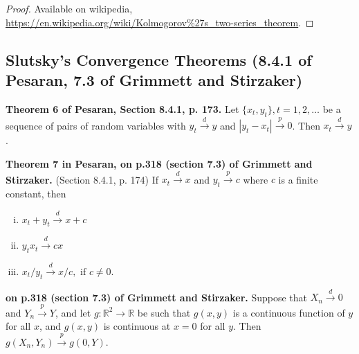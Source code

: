 \begin{proof}Available on wikipedia, \url{https://en.wikipedia.org/wiki/Kolmogorov\%27s_two-series_theorem}.\end{proof}

\subsection{Slutsky's Convergence Theorems (8.4.1 of Pesaran, 7.3 of Grimmett and Stirzaker)}

\begin{theorem}\textbf{Theorem 6 of Pesaran, Section 8.4.1, p. 173.} Let \( \{x_t, y_t\}, t = 1, 2, \ldots\) be a sequence of pairs of random variables with \(y_t \xrightarrow{d} y\) and \(\left| y_t - x_t \right| \xrightarrow{p}  0\). Then \(x_t \xrightarrow{d} y\). \end{theorem}

\begin{theorem}\label{asym.slutsky} \textbf{Theorem 7 in Pesaran, on p.318 (section 7.3) of Grimmett and Stirzaker.} (Section 8.4.1, p. 174)  If \(x_t \xrightarrow{d} x\) and \(y_t \xrightarrow{p} c\) where \(c\) is a finite constant, then

\begin{enumerate}[(i)]

\item \(x_t + y_t \xrightarrow{d} x + c\)

\item \(y_tx_t \xrightarrow{d} cx\)

\item \(x_t/y_t \xrightarrow{d}  x/c, \text{ if } c \neq 0\).

\end{enumerate} \end{theorem}

\begin{theorem} \textbf{on p.318 (section 7.3) of Grimmett and Stirzaker.} Suppose that \(X_n \xrightarrow{d} 0\) and \(Y_n \xrightarrow{p} Y\), and let \(g: \mathbb{R}^2 \to \mathbb{R}\) be such that \(g(x,y)\) is a continuous function of \(y\) for all \(x\), and \(g(x, y)\) is continuous at \(x=0\) for all \(y\). Then \(g(X_n, Y_n) \xrightarrow{p} g(0, Y)\). \end{theorem}


